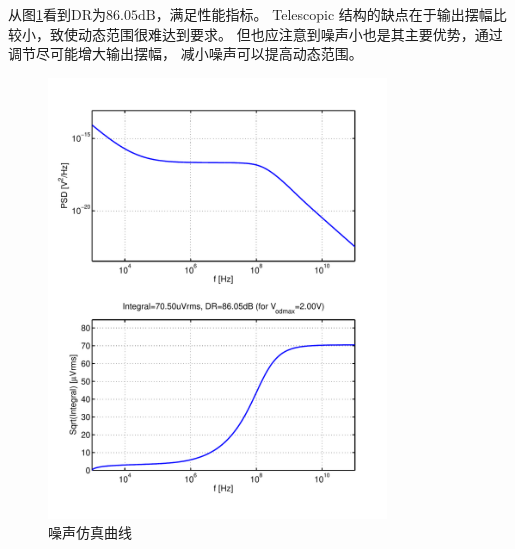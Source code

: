 \documentclass[a4paper]{article}
\newcommand{\udB}{\si{\deci\bel}}
\begin{document}
从图\ref{commonnoise}看到DR为$86.05\udB$，满足性能指标。
Telescopic 结构的缺点在于输出摆幅比较小，致使动态范围很难达到要求。
但也应注意到噪声小也是其主要优势，通过调节尽可能增大输出摆幅，
减小噪声可以提高动态范围。
\begin{figure}[htb]
    \begin{center}
        \includegraphics[width=0.8\textwidth]{common/noise.pdf}
    \end{center}
    \caption{噪声仿真曲线}
    \label{commonnoise}
\end{figure}

\newpage
\clearpage
\end{document}
